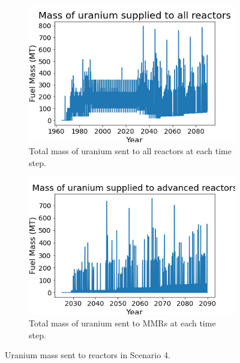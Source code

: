 \begin{figure}
    \centering
    \begin{subfigure}{0.4\textwidth}
        \centering
        \includegraphics[scale=0.3]{figures/fuelsupply_scenarios_4.png}
        \caption{Total mass of uranium sent to all reactors at each time step.}
        \label{fig:totalfuel_4}
    \end{subfigure}
    \begin{subfigure}{0.4\textwidth}
        \centering
        \includegraphics[scale=0.3]{figures/advancedRX_fuelsupply_scenarios_4.png}
        \caption{Total mass of uranium sent to \glspl{MMR} at each time step.}
        \label{fig:haleu_4}
    \end{subfigure}
    \caption{Uranium mass sent to reactors in Scenario 4.}
    \label{fig:fuel_4}
\end{figure}

